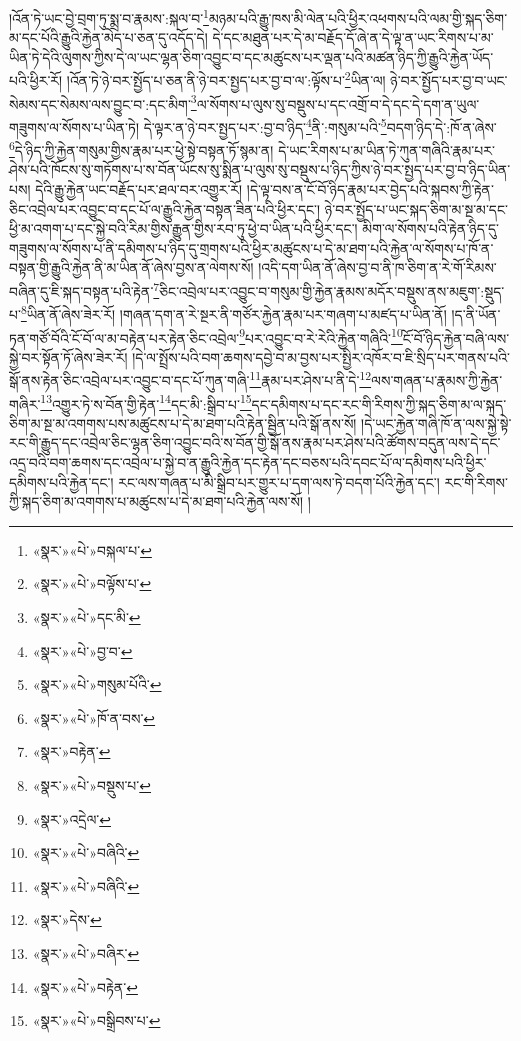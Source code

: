 །འོན་ཏེ་ཡང་བྱེ་བྲག་ཏུ་སྨྲ་བ་རྣམས་:སྐལ་བ་\footnote{«སྣར་»«པེ་»བསྐལ་པ་}མཉམ་པའི་རྒྱུ་ཁས་མི་ལེན་པའི་ཕྱིར་འཕགས་པའི་ལམ་གྱི་སྐད་ཅིག་མ་དང་པོའི་རྒྱུའི་རྐྱེན་མེད་པ་ཅན་དུ་འདོད་དེ། དེ་དང་མཐུན་པར་དེ་མ་བརྗོད་དོ་ཞེ་ན་དེ་ལྟ་ན་ཡང་རིགས་པ་མ་ཡིན་ཏེ་དེའི་ལུགས་ཀྱིས་དེ་ལ་ཡང་ལྷན་ཅིག་འབྱུང་བ་དང་མཚུངས་པར་ལྡན་པའི་མཚན་ཉིད་ཀྱི་རྒྱུའི་རྐྱེན་ཡོད་པའི་ཕྱིར་རོ། །འོན་ཏེ་ཉེ་བར་སྤྱོད་པ་ཅན་ནི་ཉེ་བར་སྤྱད་པར་བྱ་བ་ལ་:ལྟོས་པ་\footnote{«སྣར་»«པེ་»བལྟོས་པ་}ཡིན་ལ། ཉེ་བར་སྤྱོད་པར་བྱ་བ་ཡང་སེམས་དང་སེམས་ལས་བྱུང་བ་:དང་མིག་\footnote{«སྣར་»«པེ་»དང་མི་}ལ་སོགས་པ་ལུས་སུ་བསྡུས་པ་དང་འགྲོ་བ་དེ་དང་དེ་དག་ན་ཡུལ་གཟུགས་ལ་སོགས་པ་ཡིན་ཏེ། དེ་ལྟར་ན་ཉེ་བར་སྤྱད་པར་:བྱ་བ་ཉིད་\footnote{«སྣར་»«པེ་»བྱ་བ་}ནི་:གསུམ་པའི་\footnote{«སྣར་»«པེ་»གསུམ་པོའི་}བདག་ཉིད་དེ་:ཁོ་ན་ཞེས་\footnote{«སྣར་»«པེ་»ཁོ་ན་བས་}དེ་ཉིད་ཀྱི་རྐྱེན་གསུམ་གྱིས་རྣམ་པར་ཕྱེ་སྟེ་བསྟན་ཏོ་སྙམ་ན། དེ་ཡང་རིགས་པ་མ་ཡིན་ཏེ་ཀུན་གཞིའི་རྣམ་པར་ཤེས་པའི་ཁོངས་སུ་གཏོགས་པ་ས་བོན་ཡོངས་སུ་སྨིན་པ་ལུས་སུ་བསྡུས་པ་ཉིད་ཀྱིས་ཉེ་བར་སྤྱད་པར་བྱ་བ་ཉིད་ཡིན་པས། དེའི་རྒྱུ་རྐྱེན་ཡང་བརྗོད་པར་ཐལ་བར་འགྱུར་རོ། །དེ་ལྟ་བས་ན་ངོ་བོ་ཉིད་རྣམ་པར་བྱེད་པའི་སྐབས་ཀྱི་རྟེན་ཅིང་འབྲེལ་པར་འབྱུང་བ་དང་པོ་ལ་རྒྱུའི་རྐྱེན་བསྟན་ཟིན་པའི་ཕྱིར་དང་། ཉེ་བར་སྤྱོད་པ་ཡང་སྐད་ཅིག་མ་སྔ་མ་དང་ཕྱི་མ་འགག་པ་དང་སྐྱེ་བའི་རིམ་གྱིས་རྒྱུན་གྱིས་རབ་ཏུ་ཕྱེ་བ་ཡིན་པའི་ཕྱིར་དང་། མིག་ལ་སོགས་པའི་རྟེན་ཉིད་དུ་གཟུགས་ལ་སོགས་པ་ནི་དམིགས་པ་ཉིད་དུ་གྲགས་པའི་ཕྱིར་མཚུངས་པ་དེ་མ་ཐག་པའི་རྐྱེན་ལ་སོགས་པ་ཁོ་ན་བསྟན་གྱི་རྒྱུའི་རྐྱེན་ནི་མ་ཡིན་ནོ་ཞེས་བྱས་ན་ལེགས་སོ། །འདི་དག་ཡིན་ནོ་ཞེས་བྱ་བ་ནི་ཁ་ཅིག་ན་རེ་གོ་རིམས་བཞིན་དུ་ཇི་སྐད་བསྟན་པའི་རྟེན་\footnote{«སྣར་»བརྟེན་}ཅིང་འབྲེལ་པར་འབྱུང་བ་གསུམ་གྱི་རྐྱེན་རྣམས་མདོར་བསྡུས་ནས་མཇུག་:སྡུད་པ་\footnote{«སྣར་»«པེ་»བསྡུས་པ་}ཡིན་ནོ་ཞེས་ཟེར་རོ། །གཞན་དག་ན་རེ་སྔར་ནི་གཙོར་རྐྱེན་རྣམ་པར་གཞག་པ་མཛད་པ་ཡིན་ནོ། །ད་ནི་ཡོན་ཏན་གཙོ་བོའི་ངོ་བོ་ལ་མ་བརྟེན་པར་རྟེན་ཅིང་འབྲེལ་\footnote{«སྣར་»འདྲེལ་}པར་འབྱུང་བ་རེ་རེའི་རྐྱེན་གཞིའི་\footnote{«སྣར་»«པེ་»བཞིའི་}ངོ་བོ་ཉིད་རྐྱེན་བཞི་ལས་སྐྱེ་བར་སྟོན་ཏོ་ཞེས་ཟེར་རོ། །དེ་ལ་སྤྲོས་པའི་བག་ཆགས་དབྱེ་བ་མ་བྱས་པར་སྤྱིར་འཁོར་བ་ཇི་སྲིད་པར་གནས་པའི་སྒོ་ནས་རྟེན་ཅིང་འབྲེལ་པར་འབྱུང་བ་དང་པོ་ཀུན་གཞི་\footnote{«སྣར་»«པེ་»བཞིའི་}རྣམ་པར་ཤེས་པ་ནི་དེ་\footnote{«སྣར་»དེས་}ལས་གཞན་པ་རྣམས་ཀྱི་རྐྱེན་གཞིར་\footnote{«སྣར་»«པེ་»བཞིར་}འགྱུར་ཏེ་ས་བོན་གྱི་རྟེན་\footnote{«སྣར་»«པེ་»བརྟེན་}དང་མི་:སྒྲིབ་པ་\footnote{«སྣར་»«པེ་»བསྒྲིབས་པ་}དང་དམིགས་པ་དང་རང་གི་རིགས་ཀྱི་སྐད་ཅིག་མ་ལ་སྐད་ཅིག་མ་སྔ་མ་འགགས་པས་མཚུངས་པ་དེ་མ་ཐག་པའི་རྟེན་སྦྱིན་པའི་སྒོ་ནས་སོ། །དེ་ཡང་རྐྱེན་གཞི་ཁོ་ན་ལས་སྐྱེ་སྟེ་རང་གི་རྒྱུད་དང་འབྲེལ་ཅིང་ལྷན་ཅིག་འབྱུང་བའི་ས་བོན་གྱི་སྒོ་ནས་རྣམ་པར་ཤེས་པའི་ཚོགས་བདུན་ལས་དེ་དང་འདྲ་བའི་བག་ཆགས་དང་འབྲེལ་པ་སྐྱེ་བ་ན་རྒྱུའི་རྐྱེན་དང་རྟེན་དང་བཅས་པའི་དབང་པོ་ལ་དམིགས་པའི་ཕྱིར་དམིགས་པའི་རྐྱེན་དང་། རང་ལས་གཞན་པ་མི་སྒྲིབ་པར་གྱུར་པ་དག་ལས་ཏེ་བདག་པོའི་རྐྱེན་དང་། རང་གི་རིགས་ཀྱི་སྐད་ཅིག་མ་འགགས་པ་མཚུངས་པ་དེ་མ་ཐག་པའི་རྐྱེན་ལས་སོ། །
